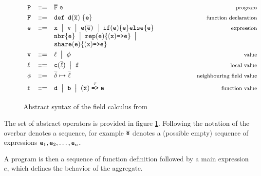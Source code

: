 \begin{figure}[t]
\centering
\centerline{$
        \begin{array}{lcl@{\hspace{18mm}}r}
                \PROGRAM & \BNFcce & \overline{\FUNCTION}  \; \e
                &{ \mbox{\footnotesize program}}
                \\[3pt]
                \FUNCTION & \BNFcce &  \defK \,\; \fname (\overline{\xname}) \; \{ \e \}
                &{ \mbox{\footnotesize function declaration}}
                \\[3pt]
                \e & \BNFcce &  \xname \;\BNFmid\; \anyvalue \;\BNFmid\; \e(\overline\e) \;\BNFmid\; \fifK (\e) \{\e\} \elseK \{\e\} \;\BNFmid &{ \mbox{\footnotesize expression}} \\
                && \nbrK\{\e\} \;\BNFmid\; \repK(\e)\{ (\xname) \ftoSym \e \} \; \BNFmid \; \\
                && \shareK(\e)\{(\xname) \ftoSym \e \}
                \\[3pt]
                \anyvalue & \BNFcce &  \lvalue \; \BNFmid \; \fvalue
                &{ \mbox{\footnotesize value}}
                \\[3pt]
              \lvalue & \BNFcce &  \dcOf{\dc}{\overline\lvalue} \; \BNFmid \; \funvalue
                &{ \mbox{\footnotesize local value}}
                \\[3pt]
                \fvalue & \BNFcce &  \envmap{\overline\deviceId}{\overline\lvalue}
                &{ \mbox{\footnotesize neighbouring field value}}
                \\[3pt]
                \funvalue & \BNFcce &  \fname \; \BNFmid \; \bname \;\BNFmid\; (\overline{\xname}) \toSym{\name} \e 
                &{ \mbox{\footnotesize function value}}
                \\[3pt]
        \end{array}
        $
}
\caption{Abstract syntax of the field calculus from \cite{FieldCalculus, Share}} \label{fig:fcsyntax}
\end{figure}

The set of abstract operators is provided in figure \ref{fig:fcsyntax}. Following the notation of \cite{FeatherJava} the overbar denotes a sequence, for example $\overline{\mathtt{e}}$  denotes a (possible empty) sequence of expressions $\mathtt{e}_1, \mathtt{e}_2, \dots, \mathtt{e}_n$.

A program is then a sequence of function definition followed by a main expression $e$, which defines the behavior of the aggregate. 

